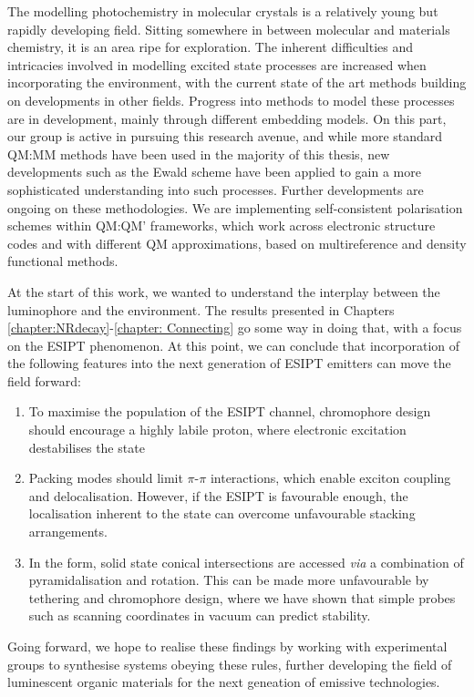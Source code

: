 The modelling photochemistry in molecular crystals is a relatively young but rapidly developing field. Sitting somewhere in between molecular and materials chemistry, it is an area ripe for exploration. The inherent difficulties and intricacies involved in modelling excited state processes are increased when incorporating the environment, with the current state of the art methods building on developments in other fields. Progress into methods to model these processes are in development, mainly through different embedding models. On this part, our group is active in pursuing this research avenue, and while more standard QM:MM methods have been used in the majority of this thesis, new developments such as the Ewald scheme have been applied to gain a more sophisticated understanding into such processes. Further developments are ongoing on these methodologies. We are implementing self-consistent polarisation schemes within QM:QM' frameworks, which work across electronic structure codes and with different QM approximations, based on multireference and density functional methods.

At the start of this work, we wanted to understand the interplay between the luminophore and the environment. The results presented in Chapters \ref{chapter:NRdecay}-\ref{chapter: Connecting} go some way in doing that, with a focus on the ESIPT phenomenon. At this point, we can conclude that incorporation of the following features into the next generation of ESIPT emitters can move the field forward:
\begin{enumerate}
    \item To maximise the population of the ESIPT channel, chromophore design should encourage a highly labile proton, where electronic excitation destabilises the \Estar{} state
    \item Packing modes should limit $\pi$-$\pi$ interactions, which enable exciton coupling and delocalisation. However, if the ESIPT is favourable enough, the localisation inherent to the \Kstar{} state can overcome unfavourable stacking arrangements.
    \item In the \Kstar{} form, solid state conical intersections are accessed \textit{via} a combination of pyramidalisation and rotation. This can be made more unfavourable by tethering and chromophore design, where we have shown that simple probes such as scanning coordinates in vacuum can predict \Kstar{} stability.
\end{enumerate}

Going forward, we hope to realise these findings by working with experimental groups to synthesise systems obeying these rules, further developing the field of luminescent organic materials for the next geneation of emissive technologies.






